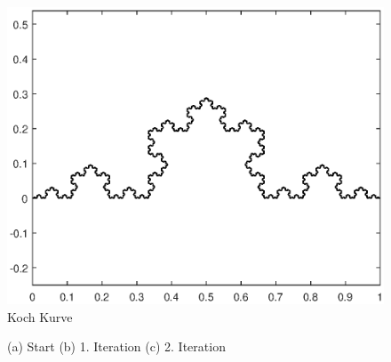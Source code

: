 \begin{figure}
	\label{ifs:kochkurve8}
	\centering
	\includegraphics{papers/ifs/images/koch8}
	\caption{Koch Kurve}
\end{figure}

\begin{figure}
	\label{ifs:kochconst}
	\centering
	\caption{(a) Start (b) 1. Iteration (c) 2. Iteration}
	\label{fig:foobar}
\end{figure}

